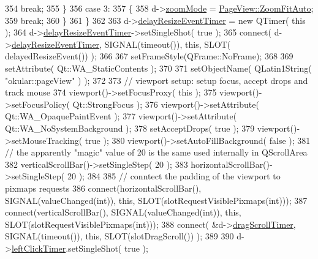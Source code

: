 \begin{DoxyCode}
354             \textcolor{keywordflow}{break};
355         \}
356         \textcolor{keywordflow}{case} 3:
357         \{
358             d->\hyperlink{classPageViewPrivate_a009f59f9f081ced030a81a8ca726c2b2}{zoomMode} = \hyperlink{classPageView_af489dc2492677bb4f422660627f62aeca4021dc6ca422fa846e8c9c31e606cdbe}{PageView::ZoomFitAuto};
359             \textcolor{keywordflow}{break};
360         \}
361     \}
362 
363     d->\hyperlink{classPageViewPrivate_a65c32086d23fd9e7fa3bd4256e7f2788}{delayResizeEventTimer} = \textcolor{keyword}{new} QTimer( \textcolor{keyword}{this} );
364     d->\hyperlink{classPageViewPrivate_a65c32086d23fd9e7fa3bd4256e7f2788}{delayResizeEventTimer}->setSingleShot( \textcolor{keyword}{true} );
365     connect( d->\hyperlink{classPageViewPrivate_a65c32086d23fd9e7fa3bd4256e7f2788}{delayResizeEventTimer}, SIGNAL(timeout()), \textcolor{keyword}{this}, SLOT(
      delayedResizeEvent()) );
366 
367     setFrameStyle(QFrame::NoFrame);
368 
369     setAttribute( Qt::WA\_StaticContents );
370 
371     setObjectName( QLatin1String( \textcolor{stringliteral}{"okular::pageView"} ) );
372 
373     \textcolor{comment}{// viewport setup: setup focus, accept drops and track mouse}
374     viewport()->setFocusProxy( \textcolor{keyword}{this} );
375     viewport()->setFocusPolicy( Qt::StrongFocus );
376     viewport()->setAttribute( Qt::WA\_OpaquePaintEvent );
377     viewport()->setAttribute( Qt::WA\_NoSystemBackground );
378     setAcceptDrops( \textcolor{keyword}{true} );
379     viewport()->setMouseTracking( \textcolor{keyword}{true} );
380     viewport()->setAutoFillBackground( \textcolor{keyword}{false} );
381     \textcolor{comment}{// the apparently "magic" value of 20 is the same used internally in QScrollArea}
382     verticalScrollBar()->setSingleStep( 20 );
383     horizontalScrollBar()->setSingleStep( 20 );
384 
385     \textcolor{comment}{// conntect the padding of the viewport to pixmaps requests}
386     connect(horizontalScrollBar(), SIGNAL(valueChanged(\textcolor{keywordtype}{int})), \textcolor{keyword}{this}, SLOT(slotRequestVisiblePixmaps(\textcolor{keywordtype}{int})));
387     connect(verticalScrollBar(), SIGNAL(valueChanged(\textcolor{keywordtype}{int})), \textcolor{keyword}{this}, SLOT(slotRequestVisiblePixmaps(\textcolor{keywordtype}{int})));
388     connect( &d->\hyperlink{classPageViewPrivate_a2aefc2e5ac5f4824c39593264277ad6a}{dragScrollTimer}, SIGNAL(timeout()), \textcolor{keyword}{this}, SLOT(slotDragScroll()) );
389 
390     d->\hyperlink{classPageViewPrivate_ac0d8482663a19cc6798a2c3b39f78d0e}{leftClickTimer}.setSingleShot( \textcolor{keyword}{true} );

\end{DoxyCode}
